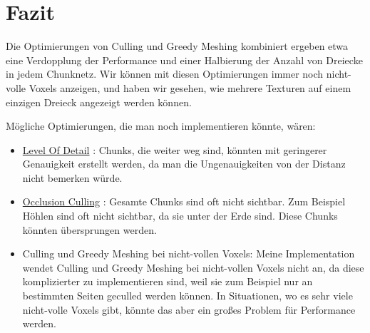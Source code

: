 \section{Fazit}

Die Optimierungen von Culling und Greedy Meshing
kombiniert ergeben etwa eine Verdopplung der
Performance und einer Halbierung der Anzahl
von Dreiecke in jedem Chunknetz.
Wir können mit diesen Optimierungen
immer noch nicht-volle Voxels anzeigen,
und haben wir gesehen, wie mehrere Texturen
auf einem einzigen Dreieck angezeigt werden können.

\vspace{0.3cm}

Mögliche Optimierungen, die man noch implementieren
könnte, wären:
\begin{itemize}
	\item \href{https://de.wikipedia.org/wiki/Level_of_Detail}{Level Of Detail} \cite{lod}:
		Chunks, die weiter weg sind, könnten mit
		geringerer Genauigkeit erstellt werden,
		da man die Ungenauigkeiten von der Distanz
		nicht bemerken würde.
	\item \href{https://en.wikipedia.org/wiki/Hidden-surface_determination#Occlusion_culling}{Occlusion Culling} \cite{occlusion}:
		Gesamte Chunks sind oft nicht sichtbar.
		Zum Beispiel Höhlen sind oft nicht sichtbar,
		da sie unter der Erde sind. Diese Chunks
		könnten übersprungen werden.
	\item Culling und Greedy Meshing bei nicht-vollen Voxels:
		Meine Implementation wendet Culling und
		Greedy Meshing bei nicht-vollen Voxels
		nicht an, da diese komplizierter zu implementieren
		sind, weil sie zum Beispiel nur an bestimmten
		Seiten geculled werden können.
		In Situationen, wo es sehr viele nicht-volle
		Voxels gibt, könnte das aber ein großes Problem
		für Performance werden.
\end{itemize}
